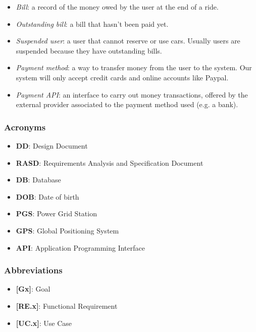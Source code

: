 \documentclass[english]{article}
\begin{document}
\begin{itemize}
\item{\textit{Bill}: a record of the money owed by the user at the end of a ride.}
\item{\textit{Outstanding bill}: a bill that hasn’t been paid yet. }
\item{\textit{Suspended user}: a user that cannot reserve or use cars. Usually users are suspended because they have outstanding bills.}
\item{\textit{Payment method}: a way to transfer money from the user to the system. Our system will only accept credit cards and online accounts like Paypal.}
\item{\textit{Payment API}: an interface to carry out money transactions, offered by the external provider associated to the payment method used (e.g. a bank).}
\end{itemize}

\subsubsection{Acronyms}
\begin{itemize}
\item{\textbf{DD}: Design Document}
\item{\textbf{RASD}: Requirements Analysis and Specification Document}
\item{\textbf{DB}: Database}
\item{\textbf{DOB}: Date of birth}
\item{\textbf{PGS}: Power Grid Station}
\item{\textbf{GPS}: Global Positioning System}
\item{\textbf{API}: Application Programming Interface}
\end{itemize}

\subsubsection{Abbreviations}
\begin{itemize}
\item{\textbf{[Gx]}: Goal}
\item{\textbf{[RE.x]}: Functional Requirement}
\item{\textbf{[UC.x]}: Use Case}
\end{itemize}
\end{document}
